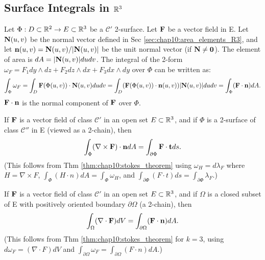 \subsection*{Surface Integrals in $\mathbb{R}^3$}
\label{sec:chap10:surface_integrals_R3}
Let $\Phi: D \subset \mathbb{R}^2 \to E \subset \mathbb{R}^3$ be a $\mathcal{C}'$
2-surface. Let $\mathbf{F}$ be a vector field in E. Let $\mathbf{N}(u,
v)$ be the normal vector defined in Sec
\ref{sec:chap10:area_elements_R3}, and let $\mathbf{n}(u, v) =
\mathbf{N}(u, v) / |\mathbf{N}(u, v)|$ be the unit normal vector (if
$\mathbf{N} \ne \mathbf{0}$). The element of area is $dA = |\mathbf{N}(u,
v)| du dv$. The integral of the 2-form $\omega_F = F_1 dy \wedge dz +
F_2 dz \wedge dx + F_3 dx \wedge dy$ over $\Phi$ can be written as:
\[
  \int_\Phi \omega_F = \int_D \mathbf{F}(\Phi(u, v)) \cdot \mathbf{N}(u,
  v) du dv = \int_D (\mathbf{F}(\Phi(u, v)) \cdot \mathbf{n}(u, v))
  |\mathbf{N}(u, v)| du dv = \int_\Phi (\mathbf{F} \cdot \mathbf{n}) dA.
\]
$\mathbf{F} \cdot \mathbf{n}$ is the normal component of $\mathbf{F}$ over $\Phi$.

\begin{theorem}
  \label{thm:chap10:stokes_formula_vector}
  If $\mathbf{F}$ is a vector field of class $\mathcal{C}'$ in an open
  set $E \subset \mathbb{R}^3$, and if $\Phi$ is a 2-surface of class
  $\mathcal{C}''$ in E (viewed as a 2-chain), then
  \[
    \int_\Phi (\nabla \times \mathbf{F}) \cdot \mathbf{n} dA =
    \int_{\partial \Phi} \mathbf{F} \cdot \mathbf{t} ds.
  \]
  (This follows from Thm \ref{thm:chap10:stokes_theorem} using
    $\omega_H = d\lambda_F$ where $H = \nabla \times F$, $\int_\Phi (H
    \cdot n) dA = \int_\Phi \omega_H$, and $\int_{\partial \Phi} (F
  \cdot t) ds = \int_{\partial \Phi} \lambda_F$.)
\end{theorem}

\begin{theorem}
  \label{thm:chap10:divergence_theorem}
  If $\mathbf{F}$ is a vector field of class $\mathcal{C}'$ in an open
  set $E \subset \mathbb{R}^3$, and if $\Omega$ is a closed subset of E with
  positively oriented boundary $\partial \Omega$ (a 2-chain), then
  \[
    \int_\Omega (\nabla \cdot \mathbf{F}) dV = \int_{\partial \Omega}
    (\mathbf{F} \cdot \mathbf{n}) dA.
  \]
  (This follows from Thm \ref{thm:chap10:stokes_theorem} for $k=3$,
    using $d\omega_F = (\nabla \cdot F) dV$ and $\int_{\partial \Omega}
  \omega_F = \int_{\partial \Omega} (F \cdot n) dA$.)
\end{theorem}

